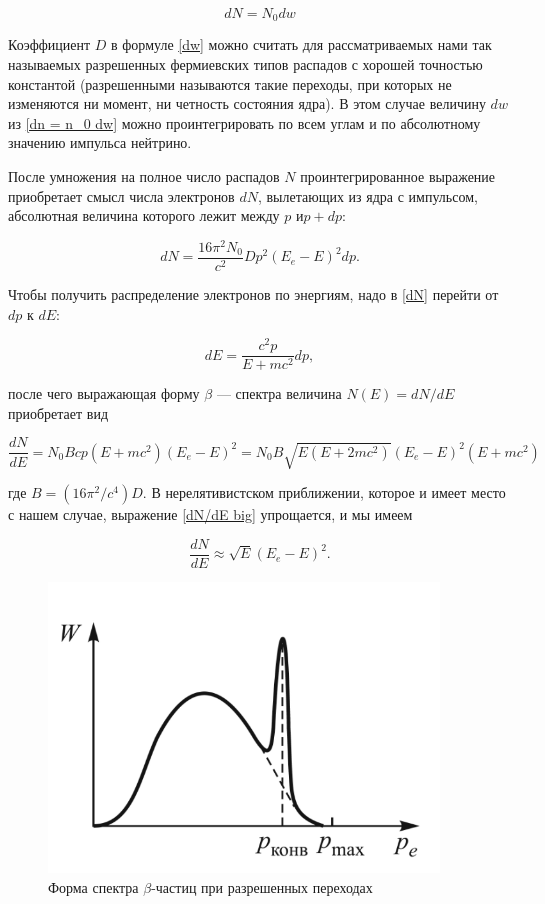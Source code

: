 \documentclass[a4paper, 12pt]{article}%
\begin{document}
	\begin{equation}\label{dn = n_0 dw}
		dN = N_0 dw  
	\end{equation}
	
	Коэффициент $ D $ в формуле \eqref{dw} можно считать для рассматриваемых нами так называемых разрешенных фермиевских типов распадов с хорошей точностью константой (разрешенными называются такие переходы, при которых не изменяются ни момент, ни четность состояния ядра). В этом случае величину $ dw $ из \eqref{dn = n_0 dw} можно проинтегрировать по всем углам и по абсолютному значению импульса нейтрино.
	
	После умножения на полное число распадов $ N $ проинтегрированное выражение приобретает смысл числа электронов $ dN $, вылетающих из ядра с импульсом, абсолютная величина которого лежит между $ p $ и$  p + dp $:
	
	\begin{equation}\label{dN}
		dN = \dfrac{16\pi^2 N_0}{c^2}Dp^2(E_e - E)^2dp.
	\end{equation}
	
	Чтобы получить распределение электронов по энергиям, надо в \eqref{dN} перейти от $ dp $ к $ dE $:
	
	\begin{equation}
		dE = \dfrac{c^2p}{E + mc^2}dp,
	\end{equation}
	
	после чего выражающая форму $\beta$ --- спектра величина $ N(E) = dN/dE $
	приобретает вид
	
	\begin{equation}\label{dN/dE big}
		\dfrac{dN}{dE} = N_0Bcp(E + mc^2)(E_e - E)^2 = N_0B\sqrt{E(E + 2mc^2)}(E_e - E)^2(E + mc^2)
	\end{equation}
	
	где $B = (16\pi^2/c^4)D$. В нерелятивистском приближении, которое и имеет место с нашем случае, выражение \eqref{dN/dE big} упрощается, и мы имеем
	
	\begin{equation}\label{dN/dE}
		\dfrac{dN}{dE} \approx \sqrt{E}(E_e - E)^2.
	\end{equation}
	
	\begin{figure}[H]
		\centering
		\includegraphics[width=0.5\linewidth]{spectr}
		\caption{Форма спектра $\beta$-частиц
			при разрешенных переходах}
	\end{figure}
	
\end{document}
